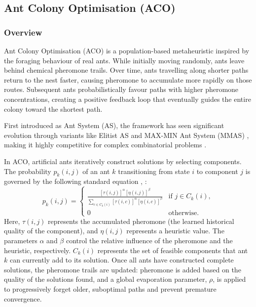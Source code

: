 \documentclass[11pt]{article}
\begin{document}
\subsection{Ant Colony Optimisation (ACO)}

\subsubsection{Overview}
Ant Colony Optimisation (ACO) is a population-based metaheuristic inspired by the foraging behaviour of real ants. While initially moving randomly, ants leave behind chemical pheromone trails. Over time, ants travelling along shorter paths return to the nest faster, causing pheromone to accumulate more rapidly on those routes. Subsequent ants probabilistically favour paths with higher pheromone concentrations, creating a positive feedback loop that eventually guides the entire colony toward the shortest path. 

First introduced as Ant System (AS), the framework has seen significant evolution through variants like Elitist AS and MAX-MIN Ant System (MMAS) \cite{stuetzle}, making it highly competitive for complex combinatorial problems \cite{levine}. 

In ACO, artificial ants iteratively construct solutions by selecting components. The probability $p_k(i,j)$ of an ant $k$ transitioning from state $i$ to component $j$ is governed by the following standard equation \cite{aaron}, \cite{gendreau}:
$$p_k(i,j) = \begin{cases} \frac{[\tau(i,j)]^{\alpha}[\eta(i,j)]^{\beta}}{\sum_{c \in C_k(i)} [\tau(i,c)]^{\alpha} [\eta(i,c)]^{\beta}} & \text{if } j \in C_k(i), \\ 0 & \text{otherwise}. \end{cases}$$
Here, $\tau(i,j)$ represents the accumulated pheromone (the learned historical quality of the component), and $\eta(i,j)$ represents a heuristic value. The parameters $\alpha$ and $\beta$ control the relative influence of the pheromone and the heuristic, respectively. $C_k(i)$ represents the set of feasible components that ant $k$ can currently add to its solution. Once all ants have constructed complete solutions, the pheromone trails are updated: pheromone is added based on the quality of the solutions found, and a global evaporation parameter, $\rho$, is applied to progressively forget older, suboptimal paths and prevent premature convergence.
\end{document}
